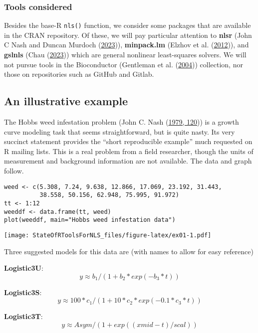 \hypertarget{tools-considered}{%
\subsubsection{Tools considered}\label{tools-considered}}

Besides the base-R \texttt{nls()} function, we consider some packages that
are available in the CRAN repository. Of these, we will pay particular
attention to \textbf{nlsr} (John C Nash and Duncan Murdoch (\protect\hyperlink{ref-nlsr2023manual}{2023})),
\textbf{minpack.lm} (Elzhov et al. (\protect\hyperlink{ref-minpacklm12}{2012})), and \textbf{gslnls} (Chau (\protect\hyperlink{ref-gslnls23}{2023})) which are
general nonlinear least-squares solvers. We will
not pursue tools in the Bioconductor (Gentleman et al. (\protect\hyperlink{ref-Bioconductor}{2004}))
collection, nor those on repositories such as
GitHub and Gitlab.

\hypertarget{an-illustrative-example}{%
\subsection{An illustrative example}\label{an-illustrative-example}}

The Hobbs weed infestation problem (John C. Nash (\protect\hyperlink{ref-cnm79}{1979, 120})) is a growth curve modeling
task that seems straightforward, but is quite nasty. Its very succinct statement
provides the ``short reproducible example'' much requested on R mailing lists.
This is a real problem from a field researcher, though the units of measurement
and background information are not available. The data and graph follow.

\begin{verbatim}
weed <- c(5.308, 7.24, 9.638, 12.866, 17.069, 23.192, 31.443,
          38.558, 50.156, 62.948, 75.995, 91.972)
tt <- 1:12
weeddf <- data.frame(tt, weed)
plot(weeddf, main="Hobbs weed infestation data")
\end{verbatim}

\texttt{[image: StateOfRToolsForNLS\_files/figure-latex/ex01-1.pdf]}

Three suggested models for this data are (with names to allow for easy reference)

\textbf{Logistic3U}:
\[  y \approx  b_1 / (1 + b_2 * exp(- b_3 * t)) \]

\textbf{Logistic3S}:
\[ y \approx  100 * c_1 / (1 + 10 * c_2 * exp(- 0.1 * c_3 * t)) \]

\textbf{Logistic3T}:
\[ y \approx Asym / (1 + exp((xmid - t)/scal)) \]

